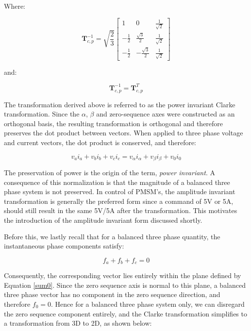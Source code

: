 \documentclass{article}
\begin{document}
Where: 

\begin{equation}
    \mathbf{T}_{c,p}^{-1}
    =
    \sqrt{\frac{2}{3}}
    \begin{bmatrix}
        1 & 0 & \frac{1}{\sqrt{2}} \\[2mm]
        -\frac{1}{2} & \frac{\sqrt{3}}{2} & \frac{1}{\sqrt{2}} \\[2mm]
        -\frac{1}{2} & -\frac{\sqrt{3}}{2} & \frac{1}{\sqrt{2}}
    \end{bmatrix}
\end{equation}

and:

\begin{equation}
    \mathbf{T}_{c,p}^{-1} = \mathbf{T}_{c,p}^T
\end{equation}

The transformation derived above is referred to as the power invariant Clarke transformation. Since the $\alpha$, $\beta$ and zero-sequence axes were constructed as an orthogonal basis, the resulting transformation is orthogonal and therefore preserves the dot product between vectors. When applied to three phase voltage and current vectors, the dot product is conserved, and therefore:

\begin{equation}
    v_ai_a + v_bi_b + v_ci_c = v_\alpha i_\alpha + v_\beta i_\beta + v_0i_0
\end{equation}

The preservation of power is the origin of the term, \textit{power invariant}. A consequence of this normalization is that the magnitude of a balanced three phase system is not preserved. In control of PMSM's, the amplitude invariant transformation is generally the preferred form since a command of 5V or 5A, should still result in the same 5V/5A after the transformation. This motivates the introduction of the amplitude invariant form discussed shortly.  

Before this, we lastly recall that for a balanced three phase quantity, the instantaneous phase components satisfy:

\begin{equation}
\label{sum0}
    f_a + f_b + f_c = 0
\end{equation}

Consequently, the corresponding vector lies entirely within the plane defined by Equation \ref{sum0}. Since the zero sequence axis is normal to this plane, a balanced three phase vector has no component in the zero sequence direction, and therefore $f_0 = 0$. Hence for a balanced three phase system only, we can disregard the zero sequence component entirely, and the Clarke transformation simplifies to a transformation from 3D to 2D, as shown below:
\end{document}
